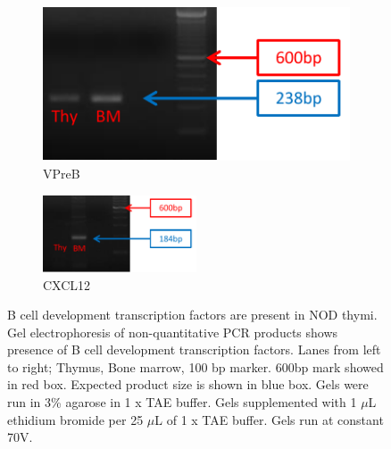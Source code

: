 \begin{figure}
	\begin{subfigure}{0.5\textwidth}
	\centering
	\includegraphics[width=\textwidth]{Figures/VPreB.pdf}
	\caption{VPreB}
	\end{subfigure}
	\begin{subfigure}{\textwidth}
	\centering
	\includegraphics[width=0.5\textwidth]{Figures/CXCL12.pdf}
	\caption{CXCL12}
	\end{subfigure}
\caption[Non quantitative PCR reveals B cell development transcription factors are present in the NOD thymus]{B cell development transcription factors are present in NOD thymi.
Gel electrophoresis of non-quantitative PCR products shows presence of B cell development transcription factors.
Lanes from left to right; Thymus, Bone marrow, 100 bp marker. 
600bp mark showed in red box.
Expected product size is shown in blue box.
Gels were run in 3\% agarose in 1 x TAE buffer. Gels supplemented with 1 $\mu$L ethidium bromide per 25 $\mu$L of 1 x TAE buffer. Gels run at constant 70V. }
\label{fig:gels}
\end{figure}





